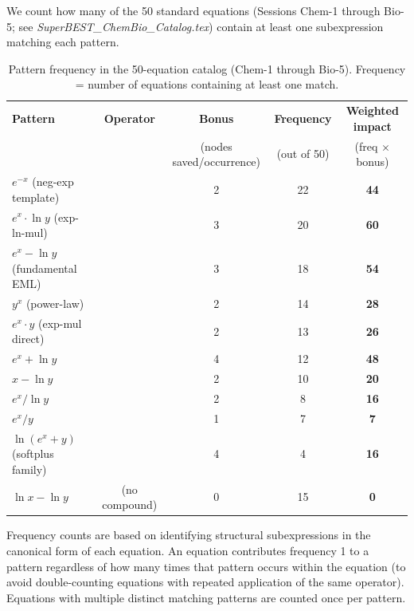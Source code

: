 \documentclass[12pt,a4paper]{article}
\theoremstyle{definition}
\newcommand{\EML}{\operatorname{EML}}
\newcommand{\EDL}{\operatorname{EDL}}
\newcommand{\EXL}{\operatorname{EXL}}
\newcommand{\EAL}{\operatorname{EAL}}
\newcommand{\DEML}{\operatorname{DEML}}
\newcommand{\ELAd}{\operatorname{ELAd}}
\newcommand{\ELSb}{\operatorname{ELSb}}
\newcommand{\LEAd}{\operatorname{LEAd}}
\newcommand{\LEdiv}{\operatorname{LEdiv}}
\newcommand{\EPL}{\operatorname{EPL}}
\begin{document}
We count how many of the 50 standard equations (Sessions Chem-1 through
Bio-5; see \textit{SuperBEST\_ChemBio\_Catalog.tex}) contain at least one
subexpression matching each pattern.

\begin{table}[h]
\centering
\caption{Pattern frequency in the 50-equation catalog (Chem-1 through Bio-5).
         Frequency = number of equations containing at least one match.}
\label{tab:frequency}
\smallskip
\begin{tabular}{@{}lcccc@{}}
\toprule
\textbf{Pattern}
  & \textbf{Operator}
  & \textbf{Bonus}
  & \textbf{Frequency}
  & \textbf{Weighted impact} \\
  & & (nodes saved/occurrence) & (out of 50) & (freq $\times$ bonus) \\
\midrule
$e^{-x}$ (neg-exp template)
  & \DEML        & 2 & 22 & \textbf{44} \\
$e^x \cdot \ln y$ (exp-ln-mul)
  & \EXL         & 3 & 20 & \textbf{60} \\
$e^x - \ln y$ (fundamental EML)
  & \EML         & 3 & 18 & \textbf{54} \\
$y^x$ (power-law)
  & \EPL         & 2 & 14 & \textbf{28} \\
$e^x \cdot y$ (exp-mul direct)
  & \ELAd        & 2 & 13 & \textbf{26} \\
$e^x + \ln y$
  & \EAL         & 4 & 12 & \textbf{48} \\
$x - \ln y$
  & \LEdiv       & 2 & 10 & \textbf{20} \\
$e^x / \ln y$
  & \EDL         & 2 &  8 & \textbf{16} \\
$e^x / y$
  & \ELSb        & 1 &  7 & \textbf{7}  \\
$\ln(e^x + y)$ (softplus family)
  & \LEAd        & 4 &  4 & \textbf{16} \\
$\ln x - \ln y$
  & (no compound)& 0 & 15 & \textbf{0}  \\
\bottomrule
\end{tabular}

\smallskip
\footnotesize{Frequency counts are based on identifying structural
subexpressions in the canonical form of each equation.  An equation
contributes frequency 1 to a pattern regardless of how many times that
pattern occurs within the equation (to avoid double-counting equations
with repeated application of the same operator).  Equations with multiple
distinct matching patterns are counted once per pattern.}
\end{table}
\end{document}
